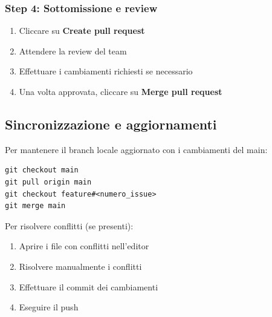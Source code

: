 \subsubsection{Step 4: Sottomissione e review}
\begin{enumerate}
  \item Cliccare su \textbf{Create pull request}
  \item Attendere la review del team
  \item Effettuare i cambiamenti richiesti se necessario
  \item Una volta approvata, cliccare su \textbf{Merge pull request}
\end{enumerate}

\subsection{Sincronizzazione e aggiornamenti}

Per mantenere il branch locale aggiornato con i cambiamenti del main:

\begin{verbatim}
git checkout main
git pull origin main
git checkout feature#<numero_issue>
git merge main
\end{verbatim}

Per risolvere conflitti (se presenti):
\begin{enumerate}
  \item Aprire i file con conflitti nell'editor
  \item Risolvere manualmente i conflitti
  \item Effettuare il commit dei cambiamenti
  \item Eseguire il push
\end{enumerate}
